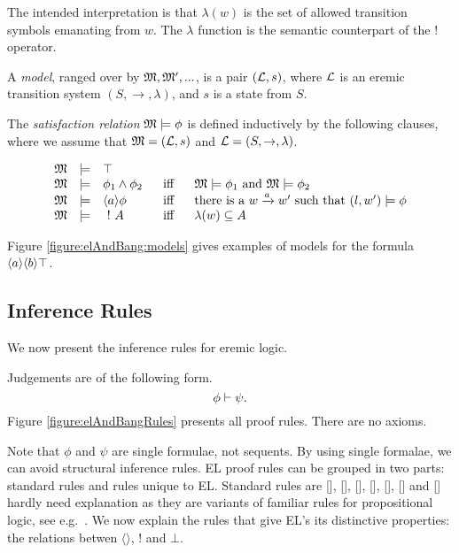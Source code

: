 \NI The intended interpretation is that $\lambda(w)$ is the set of allowed
transition symbols emanating from $w$.  The $\lambda$ function is the
semantic counterpart of the $!$ operator.

\begin{definition}
A \emph{model}, ranged over by $\frak{M}, \frak{M}', ...$, is a pair $(\mathcal{L},
s)$, where $\mathcal{L}$ is an eremic transition system $(S, \rightarrow,
\lambda)$, and $s$ is a state from $S$.
\end{definition}



\begin{definition}
The \emph{satisfaction relation} $\frak{M} \models \phi$ is defined
inductively by the following clauses, where we assume that $\frak{M} =
(\mathcal{L}, s)$ and $\mathcal{L} = (S, \rightarrow, \lambda)$.

\[
\begin{array}{lclcl}
  \MMM & \models & \top   \\
  \MMM & \models & \phi_1 \AND \phi_2 &\ \mbox{ iff } \ & \MMM  \models \phi_1 \mbox { and } \MMM \models \phi_2  \\
  \MMM & \models & \langle a \rangle \phi & \mbox{ iff } & \text{there is a } w \xrightarrow{a} w' \mbox { such that } (l,w') \models \phi  \\
  \MMM & \models & \fBang A &\mbox{ iff } & \lambda(w) \subseteq A
\end{array}
\]

\end{definition}

\NI Figure \ref{figure:elAndBang:models} gives examples of models for
the formula $\langle a \rangle \langle b \rangle \top$. 

\subsection{Inference Rules}



\NI We now present the inference rules for eremic logic. 

\begin{definition} Judgements are of the following form.
\[
  \phi \vdash \psi.
\]
Figure \ref{figure:elAndBangRules} presents all proof rules. There are
no axioms.
\end{definition}

\NI Note that $\phi$ and $\psi$ are single formulae, not sequents.  By
using single formalae, we can avoid structural inference rules.  EL
proof rules can be grouped in two parts: standard rules and rules
unique to EL.  Standard rules are [],
[], [],
[], [],
[] and [] hardly need
explanation as they are variants of familiar rules for propositional
logic, see e.g.~\cite{TroelstraAS:basprot,vanDalenD:logstr}.  We now
explain the rules that give EL's its distinctive properties: the
relations betwen $\langle \rangle$, $!$ and $\bot$.

